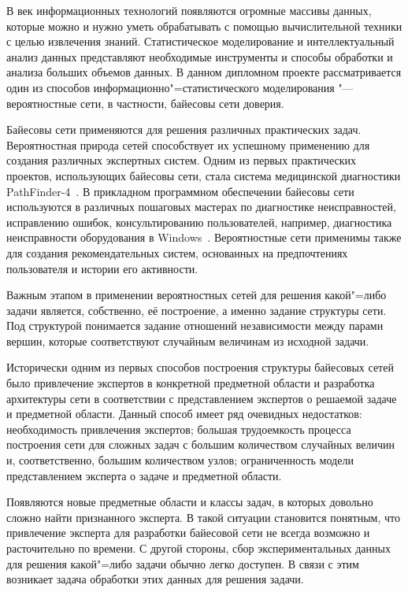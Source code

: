 \label{sec:intro}

В век информационных технологий появляются огромные массивы данных, которые можно и нужно уметь обрабатывать с помощью вычислительной техники с целью извлечения знаний.
Статистическое моделирование и интеллектуальный анализ данных представляют необходимые инструменты и способы обработки и анализа больших объемов данных.
В данном дипломном проекте рассматривается один из способов информационно"=статистического  моделирования "--- вероятностные сети, в частности, байесовы сети доверия.

Байесовы сети применяются для решения различных практических задач.
Вероятностная природа сетей способствует их успешному применению для создания различных экспертных систем.
Одним из первых практических проектов, использующих байесовы сети, стала система медицинской диагностики PathFinder-4~\cite{terehov_2003}.
В прикладном программном обеспечении байесовы сети используются в различных пошаговых мастерах по диагностике неисправностей, исправлению ошибок, консультированию пользователей, например, диагностика неисправности оборудования в Windows~\cite{terehov_2003}.
Вероятностные сети применимы также для создания рекомендательных систем, основанных на предпочтениях пользователя и истории его активности.

Важным этапом в применении вероятностных сетей для решения какой"=либо задачи является, собственно, её построение, а именно задание структуры сети.
Под структурой понимается задание отношений независимости между парами вершин, которые соответствуют случайным величинам из исходной задачи.

Исторически одним из первых способов построения структуры байесовых сетей было привлечение экспертов в конкретной предметной области и разработка архитектуры сети в соответствии с представлением экспертов о решаемой задаче и предметной области.
Данный способ имеет ряд очевидных недостатков: необходимость привлечения экспертов; большая трудоемкость процесса построения сети для сложных задач с большим количеством случайных величин и, соответственно, большим количеством узлов; ограниченность модели представлением эксперта о задаче и предметной области.

Появляются новые предметные области и классы задач, в которых довольно сложно найти признанного эксперта.
В такой ситуации становится понятным, что привлечение эксперта для разработки байесовой сети не всегда возможно и расточительно по времени.
С другой стороны, сбор экспериментальных данных для решения какой"=либо задачи обычно легко доступен.
В связи с этим возникает задача обработки этих данных для решения задачи.

